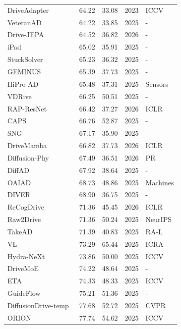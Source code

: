 \documentclass[10pt,twocolumn,letterpaper]{article}
\begin{document}
\begin{table}[t]
\begin{tabular}{l|ll|ll}
DriveAdapter~\cite{Jia2023ICCV} & 64.22 & 33.08 & 2023 & ICCV \\
VeteranAD~\cite{Zhang2025ARXIVb} & 64.22 & 33.85 & 2025 & - \\
Drive-JEPA~\cite{Wang2026ARXIV} & 64.52 & 36.82 & 2026 & - \\
iPad~\cite{Guo2025ARXIVb} & 65.02 & 35.91 & 2025 & - \\
StuckSolver~\cite{Bao2025ARXIV} & 65.23 & 36.32 & 2025 & - \\
GEMINUS~\cite{Wan2025ARXIV} & 65.39 & 37.73 & 2025 & - \\
HiPro-AD~\cite{Chen2025SENSORS} & 65.48 & 37.31 & 2025 & Sensors \\
VDRive~\cite{Guo2025ARXIV} & 66.25 & 50.51 & 2025 & - \\
RAP-ResNet~\cite{Feng2026ICLR} & 66.42 & 37.27 & 2026 & ICLR \\
CAPS~\cite{Mirkhani2025ARXIV} & 66.76 & 52.87 & 2025 & - \\
SNG~\cite{Hua2025Online} & 67.17 & 35.90 & 2025 & - \\
DriveMamba~\cite{Su2026ICLR} & 66.82 & 37.73 & 2026 & ICLR \\
Diffusion-Phy~\cite{Hu2026PR} & 67.49 & 36.51 & 2026 & PR \\
DiffAD~\cite{Wang2025ARXIVb} & 67.92 & 38.64 & 2025 & - \\
OAIAD~\cite{Yin2025Machines} & 68.73 & 48.86 & 2025 & Machines \\
DIVER~\cite{Song2025ARXIV} & 68.90 & 36.75 & 2025 & - \\ 
ReCogDrive~\cite{Li2026ICLR} & 71.36 & 45.45 & 2026 & ICLR \\
Raw2Drive~\cite{Yang2025NEURIPS} & 71.36 & 50.24 & 2025 & NeurIPS \\
TakeAD~\cite{Liu2025RAL} & 71.39 & 40.83 & 2025 & RA-L \\
VL~\cite{Arasteh2025ICRA} & 73.29 & 65.44 & 2025 & ICRA \\
Hydra-NeXt~\cite{Li2025ICCVb} & 73.86 & 50.00 & 2025 & ICCV \\
DriveMoE~\cite{Yang2025ARXIV} & 74.22 & 48.64 & 2025 & - \\
ETA~\cite{Hamdan2025ICCV} & 74.33 & 48.33 & 2025 & ICCV \\
GuideFlow~\cite{Liu2025ARXIVe} & 75.21 & 51.36 & 2025 & - \\
DiffusionDrive-temp~\cite{Liao2025CVPR} & 77.68 & 52.72 & 2025 & CVPR \\
ORION~\cite{Fu2025ICCV} & 77.74 & 54.62 & 2025 & ICCV \\

\end{tabular}
\end{table}
\end{document}
